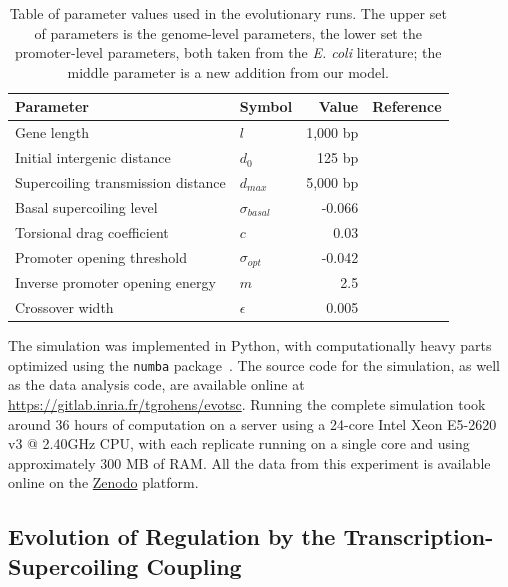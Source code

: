 \begin{table}[H]
\begin{center}
\begin{tabular}{ l l r c }
\toprule
\textbf{Parameter} & \textbf{Symbol} & \textbf{Value} & \textbf{Reference} \\
\midrule
Gene length & $l$ & 1,000 bp & \cite{blattner1997} \\
Initial intergenic distance & $d_0$ & 125 bp & \cite{blattner1997} \\
Supercoiling transmission distance & $d_{max}$ & 5,000 bp & \cite{postow2004} \\
Basal supercoiling level & $\sigma_{basal}$ & -0.066 & \cite{crozat2005} \\
\midrule
Torsional drag coefficient & $c$ & 0.03 & \\
\midrule
Promoter opening threshold & $\sigma_{opt}$ & -0.042 & \cite{elhoudaigui2019} \\
Inverse promoter opening energy & $m$ & 2.5 & \cite{elhoudaigui2019} \\
Crossover width & $\epsilon$ & 0.005 & \cite{elhoudaigui2019} \\
\bottomrule
\end{tabular}
\end{center}
\caption[Table of parameter values used for the advanced \emph{EvoTSC} runs]{Table of parameter values used in the evolutionary runs.
The upper set of parameters is the genome-level parameters, the lower set the promoter-level parameters, both taken from the \emph{E. coli} literature; the middle parameter is a new addition from our model.}
\label{tab:param_values}
\end{table}

The simulation was implemented in Python, with computationally heavy parts optimized using the \texttt{numba} package~\citep{lam2015}. The source code for the simulation, as well as the data analysis code, are available online at \url{https://gitlab.inria.fr/tgrohens/evotsc}.
Running the complete simulation took around 36 hours of computation on a server using a 24-core Intel Xeon E5-2620 v3 @ 2.40GHz CPU, with each replicate running on a single core and using approximately 300 MB of RAM.
All the data from this experiment is available online on the \href{https://doi.org/10.5281/zenodo.7062757}{Zenodo} platform.


\subsection{Evolution of Regulation by the Transcription-Supercoiling Coupling}

